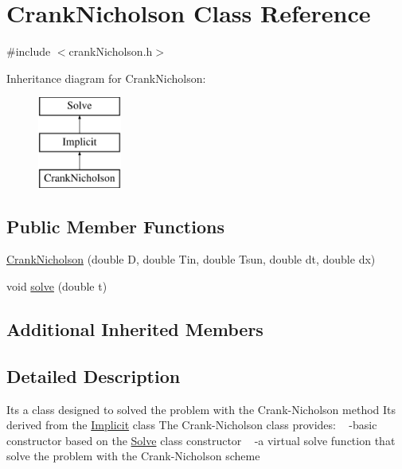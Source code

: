 \hypertarget{class_crank_nicholson}{}\section{Crank\+Nicholson Class Reference}
\label{class_crank_nicholson}


{\ttfamily \#include $<$crank\+Nicholson.\+h$>$}

Inheritance diagram for Crank\+Nicholson\+:\begin{figure}[H]
\begin{center}
\leavevmode
\includegraphics[height=3.000000cm]{class_crank_nicholson}
\end{center}
\end{figure}
\subsection*{Public Member Functions}
\begin{DoxyCompactItemize}
\item 
\hyperlink{class_crank_nicholson_a77c284d244c4c0aabcd2b7d35efc356e}{Crank\+Nicholson} (double D, double Tin, double Tsun, double dt, double dx)
\item 
void \hyperlink{class_crank_nicholson_a999d04c6ef97b0794f66584f9192dbee}{solve} (double t)
\end{DoxyCompactItemize}
\subsection*{Additional Inherited Members}


\subsection{Detailed Description}
It\textquotesingle{}s a class designed to solved the problem with the Crank-\/\+Nicholson method It\textquotesingle{}s derived from the \hyperlink{class_implicit}{Implicit} class The Crank-\/\+Nicholson class provides\+: ~\newline
-\/basic constructor based on the \hyperlink{class_solve}{Solve} class constructor ~\newline
-\/a virtual solve function that solve the problem with the Crank-\/\+Nicholson scheme 

